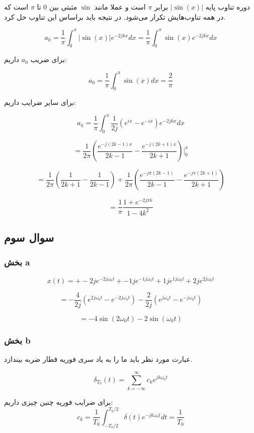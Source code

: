 \documentclass[12pt]{article}
\begin{document}
دوره تناوب پایه $|\sin (x)|$ برابر $\pi$ است و عملا مانند $\sin$ مثبتی بین $0$ تا $\pi$ است که در همه تناوب‌هایش تکرار می‌شود. در نتیجه باید براساس این تناوب حل کرد.

$$a_k = \frac{1}{\pi} \int_{0}^{\pi} |\sin (x)| e^{- 2 j k x} dx = \frac{1}{\pi}\int_{0}^{\pi} \sin (x) e^{- 2 j k x} dx $$

برای ضریب $a_0$ داریم:

$$a_0 = \frac{1}{\pi} \int_{0}^{\pi} \sin (x) dx = \frac{2}{\pi}$$


برای سایر ضرایب داریم:

$$a_k = \frac{1}{\pi}\int_{0}^{\pi} \frac{1}{2 j} (e^{i x} - e^{-ix}) e^{- 2 j k x}  dx$$

$$=\frac{1}{2 \pi} \left(\frac{e^{-j (2 k-1) x}}{2 k-1}-\frac{e^{-j (2 k+1) x}}{2 k+1}\right)|_{0}^{\pi}$$

$$=\frac{1}{2\pi} \left(\frac{1}{2 k+1}-\frac{1}{2 k-1}\right)+\frac{1}{2\pi} \left(\frac{e^{-j \pi  (2 k-1)}}{2 k-1}-\frac{e^{-j \pi  (2 k+1)}}{2 k+1}\right)$$

$$=\boxed{\frac{1}{\pi}\frac{1+e^{-2 j \pi  k}}{1-4 k^2}}$$

\subsection{سوال سوم}

\subsubsection{بخش a}



$$x(t) = 
+-2j e^{-2j \omega_0 t}
+-1j e^{-1j \omega_0 t}
+1j e^{1j \omega_0 t}
+2j e^{2j \omega_0 t}
$$

$$=
-\frac{4}{2j}(e^{2j \omega_0 t} - e^{-2j \omega_0 t})
-\frac{2}{2j}(e^{j \omega_0 t} - e^{-j \omega_0 t})$$

$$\boxed{= -4 \sin(2 \omega_0 t) -2 \sin( \omega_0 t)}$$


\subsubsection{بخش b}

عبارت مورد نظر باید ما را به یاد سری فوریه قطار ضربه بیندازد.

$$\delta_{T_0} (t) = \sum_{k=-\infty}^{\infty} c_k e^{jk\omega_0 t}$$

برای ضرایب فوریه چنین چیزی داریم:
$$
c_{k}=\frac{1}{T_{0}} \int_{-T_{0} / 2}^{T_{0} / 2} \delta(t) e^{-j k \omega_{0} t} d t=\frac{1}{T_{0}}
$$
\end{document}
